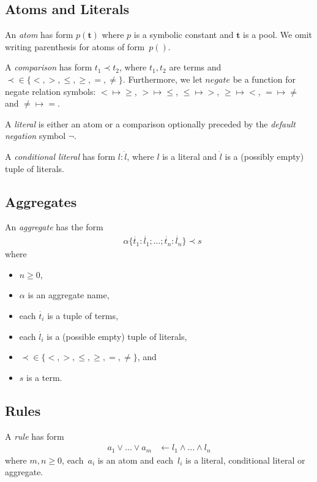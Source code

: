 \documentclass{article}
\newcommand{\pool}[1]{\boldsymbol{#1}}
\newcommand{\tuple}[1]{\dot{#1}}
\newcommand{\set}[1]{\{#1\}}
\newcommand\Negate{\mathit{negate}}
\begin{document}
	\subsection{Atoms and Literals}

	An \emph{atom} has form $p(\pool{t})$ where $p$ is a symbolic constant and $\pool{t}$ is a pool.
	We omit writing parenthesis for atoms of form~\(p()\).

	A \emph{comparison} has form $t_1 \prec t_2$, where $t_1,t_2$ are terms and ${\prec} \in \set{{<}, {>}, {\leq}, {\geq}, {=}, {\neq}}$.
	Furthermore, we let $\Negate$ be a function for negate relation symbols:
	${<} \mapsto {\geq}$,
	${>} \mapsto {\leq}$,
	${\leq} \mapsto {>}$,
	${\geq} \mapsto {<}$,
	${=} \mapsto {\neq}$ and
	${\neq} \mapsto {=}$.

	A \emph{literal} is either an atom or a comparison optionally preceded by the \emph{default negation} symbol $\neg$.

	A \emph{conditional literal} has form $l : \tuple{l}$, where $l$ is a literal and $\tuple{l}$ is a (possibly empty) tuple of literals.

	\subsection{Aggregates}
	An \emph{aggregate} has the form
	\begin{align}
		&\alpha\{\tuple{t_1} : \tuple{l_1}; \dots; \tuple{t_n} : \tuple{l_n}\} \prec s \label{aggregate}
	\end{align}
	where
	\begin{itemize}
		\item $n \geq 0$,
		\item $\alpha$ is an aggregate name,
		\item each $\tuple{t_i}$ is a tuple of terms,
		\item each $\tuple{l_i}$ is a (possible empty) tuple of literals,
		\item ${\prec} \in \set{{<}, {>}, {\leq}, {\geq}, {=}, {\neq}}$, and
		\item $s$ is a term.
	\end{itemize}

	\subsection{Rules}

	A \emph{rule} has form
	\begin{align}
		a_1 \vee \dots \vee a_m &\leftarrow l_1 \wedge \dots \wedge l_n \label{rule}
	\end{align}
	where $m, n \ge 0$, each~$a_i$ is an atom and each~$l_i$ is a literal, conditional literal or aggregate.
\end{document}
